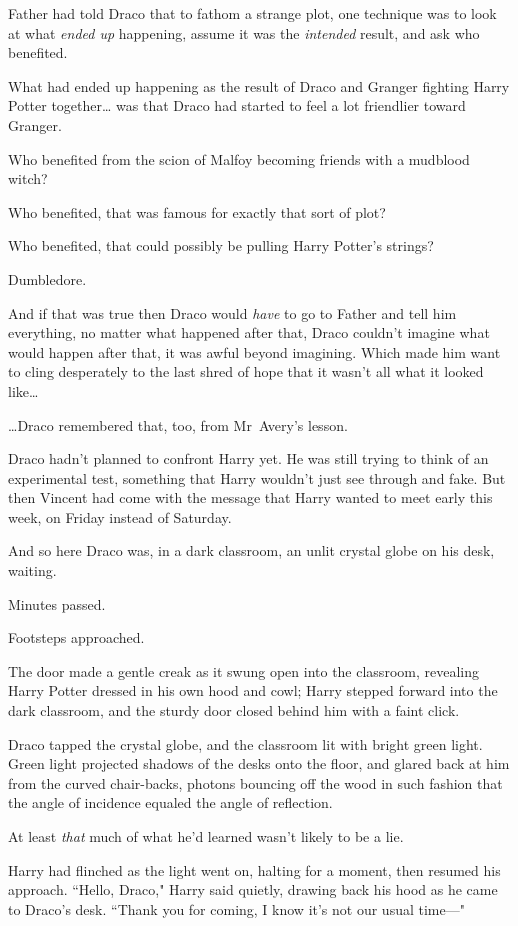Father had told Draco that to fathom a strange plot, one technique was to look at what \emph{ended up} happening, assume it was the \emph{intended} result, and ask who benefited.

What had ended up happening as the result of Draco and Granger fighting Harry Potter together{\ldots} was that Draco had started to feel a lot friendlier toward Granger.

Who benefited from the scion of Malfoy becoming friends with a mudblood witch?

Who benefited, that was famous for exactly that sort of plot?

Who benefited, that could possibly be pulling Harry Potter's strings?

Dumbledore.

And if that was true then Draco would \emph{have} to go to Father and tell him everything, no matter what happened after that, Draco couldn't imagine what would happen after that, it was awful beyond imagining. Which made him want to cling desperately to the last shred of hope that it wasn't all what it looked like{\ldots}

{\ldots}Draco remembered that, too, from Mr~Avery's lesson.

Draco hadn't planned to confront Harry yet. He was still trying to think of an experimental test, something that Harry wouldn't just see through and fake. But then Vincent had come with the message that Harry wanted to meet early this week, on Friday instead of Saturday.

And so here Draco was, in a dark classroom, an unlit crystal globe on his desk, waiting.

Minutes passed.

Footsteps approached.

The door made a gentle creak as it swung open into the classroom, revealing Harry Potter dressed in his own hood and cowl; Harry stepped forward into the dark classroom, and the sturdy door closed behind him with a faint click.

Draco tapped the crystal globe, and the classroom lit with bright green light. Green light projected shadows of the desks onto the floor, and glared back at him from the curved chair-backs, photons bouncing off the wood in such fashion that the angle of incidence equaled the angle of reflection.

At least \emph{that} much of what he'd learned wasn't likely to be a lie.

Harry had flinched as the light went on, halting for a moment, then resumed his approach. ``Hello, Draco," Harry said quietly, drawing back his hood as he came to Draco's desk. ``Thank you for coming, I know it's not our usual time—"

